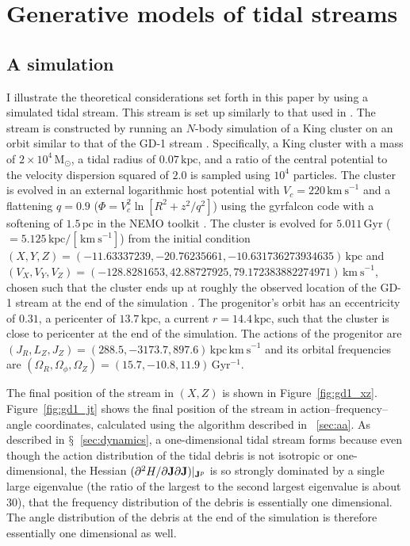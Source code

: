 \documentclass[12pt,preprint]{aastex}
\renewcommand{\figurename}{Figure}
\newcommand{\sectionname}{$\mathsection$}
\renewcommand{\vec}[1]{\ensuremath{\mathbf{#1}}}
\newcommand{\vecj}{\ensuremath{\vec{J}}}
\newcommand{\Gyr}{\ensuremath{\,\mathrm{Gyr}}}
\newcommand{\kpc}{\ensuremath{\,\mathrm{kpc}}}
\newcommand{\pc}{\ensuremath{\,\mathrm{pc}}}
\newcommand{\kms}{\ensuremath{\,\mathrm{km\ s}^{-1}}}
\newcommand{\msun}{\ensuremath{\,\mathrm{M}_{\odot}}}
\newcommand{\inv}{\ensuremath{^{-1}}}
\begin{document}
\section{Generative models of tidal streams}\label{sec:generative}

\subsection{A simulation}\label{sec:sim}

I illustrate the theoretical considerations set forth in this paper by
using a simulated tidal stream. This stream is set up similarly to
that used in \citet{Sanders13b}. The stream is constructed by running
an $N$-body simulation of a King cluster on an orbit similar to that
of the GD-1 stream \citep{Koposov10a}. Specifically, a King cluster
with a mass of $2\times10^4\msun$, a tidal radius of $0.07\kpc$, and a
ratio of the central potential to the velocity dispersion squared of
$2.0$ is sampled using $10^4$ particles. The cluster is evolved in an
external logarithmic host potential with $V_c = 220\kms$ and a
flattening $q=0.9$ ($\Phi = V_c^2 \ln [R^2 + z^2/q^2]$) using the
gyrfalcon code \citep{Dehnen00a,Dehnen02a} with a softening of
$1.5\pc$ in the NEMO toolkit \citep{Teuben95a}. The cluster is evolved
for $5.011\Gyr$ ($=5.125\kpc/[\kms]$) from the initial condition
$(X,Y,Z) = (-11.63337239,-20.76235661,-10.631736273934635)\kpc$ and
$(V_X,V_Y,V_Z) = (-128.8281653,42.88727925,79.172383882274971)\kms$,
chosen such that the cluster ends up at roughly the observed location
of the GD-1 stream at the end of the simulation
\citep{Koposov10a}. The progenitor's orbit has an eccentricity of
$0.31$, a pericenter of $13.7\kpc$, a current $r=14.4\kpc$, such that
the cluster is close to pericenter at the end of the simulation. The
actions of the progenitor are $(J_R,L_Z,J_Z) =
(288.5,-3173.7,897.6)\kpc\kms$ and its orbital frequencies are
$(\Omega_R,\Omega_\phi,\Omega_Z) = (15.7,-10.8,11.9)\Gyr\inv$.

The final position of the stream in $(X,Z)$ is shown in
\figurename~\ref{fig:gd1_xz}. \figurename~\ref{fig:gd1_jt} shows the
final position of the stream in action--frequency--angle coordinates,
calculated using the algorithm described in
\appendixname~\ref{sec:aa}. As described in
\sectionname~\ref{sec:dynamics}, a one-dimensional tidal stream forms
because even though the action distribution of the tidal debris is not
isotropic or one-dimensional, the Hessian $(\partial^2 H / \partial
\vecj \partial \vecj)\large|_{\vecj^p}$ is so strongly dominated by a
single large eigenvalue (the ratio of the largest to the second
largest eigenvalue is about $30$), that the frequency distribution of
the debris is essentially one dimensional. The angle distribution of
the debris at the end of the simulation is therefore essentially one
dimensional as well.
\end{document}
